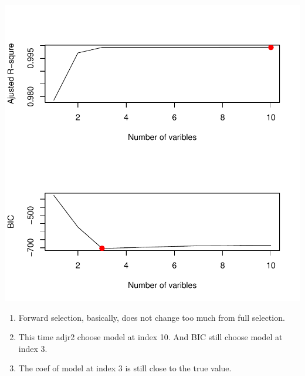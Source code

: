 \documentclass[a4paper]{article}
\begin{document}
\includegraphics{modelselection-8df}
{\color{red}
\begin{enumerate}
\item Forward selection, basically, does not change too much from full selection.
\item This time adjr2 choose model at index 10. And BIC still choose model at index 3.
\item The coef of model at index 3 is still close to the true value.
\end{enumerate}
}
\end{document}
